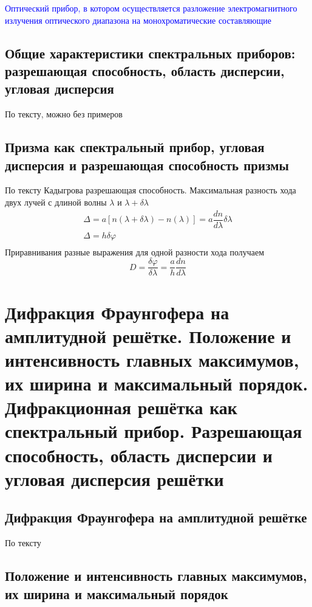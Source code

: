 \documentclass[a4paper, 14pt]{article}
\begin{document}
    \textcolor{blue}{Оптический прибор, в котором осуществляется разложение электромагнитного излучения оптического
    диапазона на монохроматические составляющие}
    
    \subsection{Общие характеристики спектральных приборов: разрешающая способность, область дисперсии, угловая дисперсия}
    
    По тексту, можно без примеров
    
    \subsection{Призма как спектральный прибор, угловая дисперсия и разрешающая способность призмы}
    
    По тексту Кадыгрова разрешающая способность.
    Максимальная разность хода двух лучей с длиной волны $\lambda$ и $\lambda + \delta \lambda$
    \begin{gather*}
        \Delta = a[n(\lambda + \delta \lambda) - n(\lambda)] = a \dfrac{dn}{d \lambda} \delta \lambda\\
        \Delta = h \delta \varphi\\
    \end{gather*}
    Приравнивания разные выражения для одной разности хода получаем
    \[ D = \dfrac{\delta \varphi}{\delta \lambda} = \frac{a}{h} \dfrac{dn}{d \lambda} \]
    
    \section{Дифракция Фраунгофера на амплитудной решётке.
    Положение и интенсивность главных максимумов, их ширина и максимальный порядок.
    Дифракционная решётка как спектральный прибор.
    Разрешающая способность, область дисперсии и угловая дисперсия решётки}
    
    \subsection{Дифракция Фраунгофера на амплитудной решётке}
    
    По тексту
    
    \subsection{Положение и интенсивность главных максимумов, их ширина и максимальный порядок}
    
\end{document}
